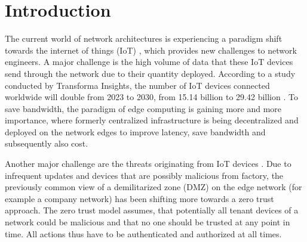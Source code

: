 \chapter{Introduction}
\iffalse
\begin{itemize}
    \item Motivation $\rightarrow$ With threats
    \begin{itemize}
        \item Focus on the current IoT domain and the existence of critical communication channels
        \item Provide example of remote surgery
        \item State some threats to this communication channel (CIA) - those will be picked up and formalized in the related work chapter
    \end{itemize}

    \item Objective
    \begin{itemize}
        \item
    \end{itemize}

    \item Structure
\end{itemize}
\fi

The current world of network architectures is experiencing a paradigm shift towards the internet of things (IoT) \cite{iot}, which provides new challenges to network engineers. A major challenge is the high volume of data that these IoT devices send through the network due to their quantity deployed. According to a study conducted by Transforma Insights, the number of IoT devices connected worldwide will double from 2023 to 2030, from 15.14 billion to 29.42 billion \cite{iotincrease}. To save bandwidth, the paradigm of edge computing \cite{edgecomputing} is gaining more and more importance, where formerly centralized infrastructure is being decentralized and deployed on the network edges to improve latency, save bandwidth and subsequently also cost.

Another major challenge are the threats originating from IoT devices \cite{iotthreats}. Due to infrequent updates and devices that are possibly malicious from factory, the previously common view of a demilitarized zone (DMZ) on the edge network (for example a company network) has been shifting more towards a zero trust approach. The zero trust model \cite{zerotrust} assumes, that potentially all tenant devices of a network could be malicious and that no one should be trusted at any point in time. All actions thus have to be authenticated and authorized at all times.

